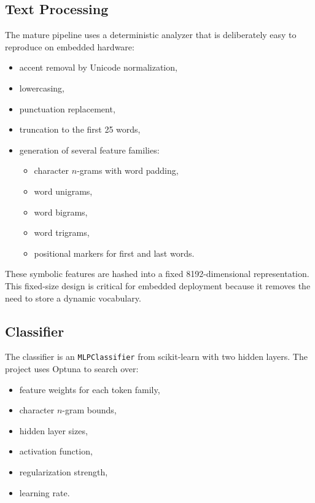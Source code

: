 \documentclass[11pt,a4paper]{article}
\begin{document}
\subsection{Text Processing}

The mature pipeline uses a deterministic analyzer that is deliberately easy to reproduce on embedded hardware:

\begin{itemize}
    \item accent removal by Unicode normalization,
    \item lowercasing,
    \item punctuation replacement,
    \item truncation to the first 25 words,
    \item generation of several feature families:
    \begin{itemize}
        \item character \(n\)-grams with word padding,
        \item word unigrams,
        \item word bigrams,
        \item word trigrams,
        \item positional markers for first and last words.
    \end{itemize}
\end{itemize}

These symbolic features are hashed into a fixed 8192-dimensional representation. This fixed-size design is critical for embedded deployment because it removes the need to store a dynamic vocabulary.

\subsection{Classifier}

The classifier is an \texttt{MLPClassifier} from scikit-learn with two hidden layers. The project uses Optuna to search over:

\begin{itemize}
    \item feature weights for each token family,
    \item character \(n\)-gram bounds,
    \item hidden layer sizes,
    \item activation function,
    \item regularization strength,
    \item learning rate.
\end{itemize}
\end{document}
